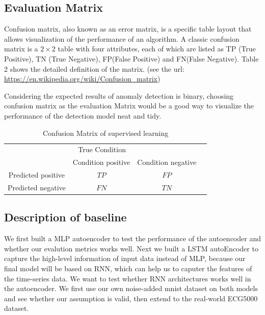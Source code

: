 \documentclass{article}
\begin{document}
\subsection{Evaluation Matrix}
Confusion matrix, also known as an error matrix, is a specific table layout that allows visualization of the performance of an algorithm. A classic confusion matrix is a $2\times 2$ table with four attributes, each of which are listed as TP (True Positive), TN (True Negative), FP(False Positive) and FN(False Negative). Table 2 shows the detailed definition of the matrix. (see the url: \url{https://en.wikipedia.org/wiki/Confusion_matrix})

Considering the expected results of anomaly detection is binary, choosing confusion matrix as the evaluation Matrix would be a good way to visualize the performance of the detection model neat and tidy. 

\begin{table}
  \caption{Confusion Matrix of supervised learning}
  \label{obd data}
  \centering
  \begin{tabular}{cccc}
    \toprule
    \multicolumn{3}{c}{True Condition}                   \\
    \cmidrule(r){1-3}
    & Condition positive & Condition negative      \\
    \midrule
    Predicted positive & $TP$ & $FP$     \\
    Predicted negative & $FN$ & $TN$       \\
    \bottomrule
  \end{tabular}
\end{table}

\subsection{Description of baseline}
We first built a MLP autoencoder to test the performance of the autoencoder and whether our evalution metrics works well. Next we built a LSTM autoEncoder to capture the high-level information of input data instead of MLP, because our final model will be based on RNN, which can help us to caputer the features of the time-series data. We want to test whether RNN architectures works well in the autoencoder. We first use our own noise-added mnist dataset on both models and see whether our assumption is valid, then extend to the real-world ECG5000 dataset. 
\end{document}
